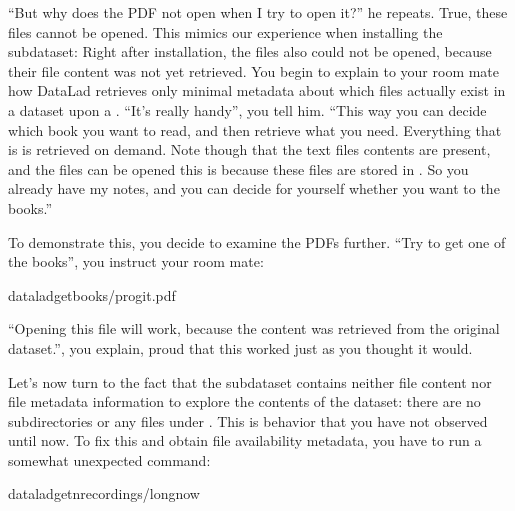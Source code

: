 \newpage
{}\ignorespaces 
\sphinxAtStartPar
“But why does the PDF not open when I try to open it?” he repeats.
True, these files cannot be opened. This mimics our experience when
installing the  subdataset: Right after installation,
the  files also could not be opened, because their file
content was not yet retrieved. You begin to explain to your room mate
how DataLad retrieves only minimal metadata about which files actually
exist in a dataset upon a . “It’s really handy”,
you tell him. “This way you can decide which book you want to read,
and then retrieve what you need. Everything that is  is retrieved
on demand. Note though that the text files
contents are present, and the files can be opened \textendash{} this is because
these files are stored in {\hyperref[\detokenize{glossary:term-Git}]{}}. So you already have my notes,
and you can decide for yourself whether you want to  the books.”

\sphinxAtStartPar
To demonstrate this, you decide to examine the PDFs further.
“Try to get one of the books”, you instruct your room mate:

\begin{sphinxVerbatim}[commandchars=\\\{\}]
dataladgetbooks/progit.pdf
\end{sphinxVerbatim}

\sphinxAtStartPar
“Opening this file will work, because the content was retrieved from
the original dataset.”, you explain, proud that this worked just as you
thought it would.

\sphinxAtStartPar
Let’s now turn to the fact that the subdataset  contains neither
file content nor file metadata information to explore the contents of the
dataset: there are no subdirectories or any files under .
This is behavior that you have not observed until now.
To fix this and obtain file availability metadata,
you have to run a somewhat unexpected command:

\begin{sphinxVerbatim}[commandchars=\\\{\}]
dataladget\PYGZhy{}nrecordings/longnow
\end{sphinxVerbatim}

